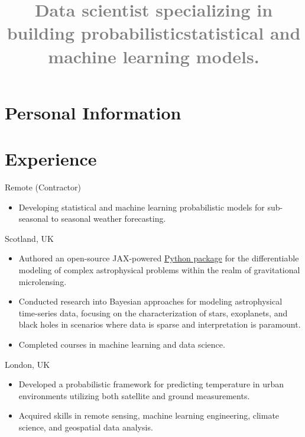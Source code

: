 \documentclass[11pt,a4paper,roman, colorlinks]{moderncv}
\title{\textcolor{gray}{ \normalsize Data scientist specializing in building probabilistic\newline statistical and machine learning models.}}
\begin{document}
\renewcommand*{\titlefont}{\fontsize{10}{14}\mdseries\upshape}
\renewcommand*{\namefont}{\fontsize{32}{34}\mdseries\upshape}
\patchcmd{\section}{0.95ex}{0.5ex}{}{}
\makecvtitle

\section{Personal Information}

\hypersetup{urlcolor=links}
\section{Experience}
{Remote (Contractor)}{}{
    \begin{itemize}
        \item Developing statistical and machine learning probabilistic models for sub-seasonal to seasonal weather forecasting.
    \end{itemize}
}
{Scotland, UK}{}{
    \begin{itemize}
        \item Authored an open-source \textsf{JAX}-powered 
              \href{https://github.com/fbartolic/caustics}{Python package} for the differentiable
              modeling of complex astrophysical problems within the realm of gravitational
              microlensing.
        \item Conducted research into Bayesian approaches for modeling astrophysical
              time-series data, focusing on the characterization of stars, exoplanets, and black holes
              in scenarios where data is sparse and interpretation is paramount.
        \item Completed courses in machine learning and data science.
    \end{itemize}
}
{London, UK}{}{
    \begin{itemize}
        \item Developed a probabilistic framework for predicting temperature in urban
              environments utilizing both satellite and ground measurements.
        \item Acquired skills in remote sensing, machine learning engineering, climate
              science, and geospatial data analysis.
    \end{itemize}}
\end{document}
